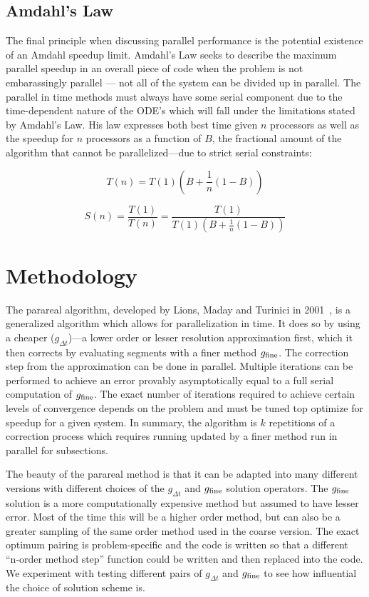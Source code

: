 \documentclass[letterpaper,12pt]{article}
\begin{document}
\subsection{Amdahl's Law}

The final principle when discussing parallel performance is the potential existence of an Amdahl speedup limit. Amdahl's Law seeks to describe the maximum parallel speedup in an overall piece of code when the problem is not embarassingly parallel --- not all of the system can be divided up in parallel. The parallel in time methods must always have some serial component due to the time-dependent nature of the ODE's which will fall under the limitations stated by Amdahl's Law.  His law expresses both best time given $n$ processors as well as the speedup for $n$ processors as a function of $B$, the fractional amount of the algorithm that cannot be parallelized---due to strict serial constraints:

\begin{equation}
T(n) = T(1) \left( B + \frac{1}{n} (1-B) \right)
\end{equation}

\begin{equation}
S(n) = \frac{T(1)}{T(n)} = \frac{T(1)}{ T(1) \left( B + \frac{1}{n} (1-B) \right)}
\end{equation}

\section{Methodology}

The parareal algorithm, developed by Lions, Maday and Turinici in
2001~\cite{lions2001parareal}, is a generalized algorithm which allows for
parallelization in time. It does so by using a cheaper ($g_{\Delta t}$)---a
lower order or lesser resolution approximation first, which it then corrects by
evaluating segments with a finer method $g_{\textnormal{fine}}$. The correction
step from the approximation can be done in parallel. Multiple iterations can be
performed to achieve an error provably asymptotically equal to a full serial
computation of $g_{\textnormal{fine}}$. The exact number of iterations required
to achieve certain levels of convergence depends on the problem and must be
tuned top optimize for speedup for a given system. In summary, the algorithm is
$k$ repetitions of a correction process which requires running updated by a
finer method run in parallel for subsections.

The beauty of the parareal method is that it can be adapted into many different versions with different choices of the $g_{\Delta t}$ and $g_{\textnormal{fine}}$ solution operators. The $g_{\textnormal{fine}}$ solution is a more computationally expensive method but assumed to have lesser error.  Most of the time this will be a higher order method, but can also be a greater sampling of the same order method used in the coarse version.  The exact optimum pairing is problem-specific and the code is written so that a different ``n-order method step'' function could be written and then replaced into the code. We experiment with testing different pairs of $g_{\Delta t}$ and $g_{\textnormal{fine}}$ to see how influential the choice of solution scheme is.
\end{document}

